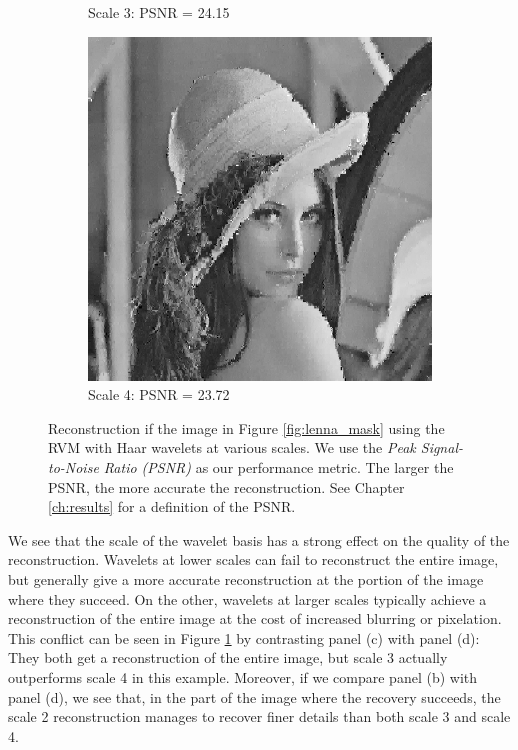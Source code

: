\begin{figure}
\begin{subfigure}{0.4\textwidth}
    \caption{Scale 3: PSNR = 24.15}
  \end{subfigure}
  \begin{subfigure}{0.4\textwidth}
    \includegraphics[width=\textwidth]{Chapter5/Images/lenna_haar4.png}
    \caption{Scale 4: PSNR = 23.72}
  \end{subfigure}  
  \caption{Reconstruction if the image in Figure \ref{fig:lenna_mask} using the RVM with Haar wavelets at various scales.
    We use the \emph{Peak Signal-to-Noise Ratio (PSNR)} as our performance metric. The larger the PSNR, the more accurate the reconstruction. See Chapter \ref{ch:results} for a definition of the PSNR.}
  \label{fig:lenna_rvm}
\end{figure}

We see that the scale of the wavelet basis has a strong effect on the quality of the reconstruction.
Wavelets at lower scales can fail to reconstruct the entire image, but generally give a more accurate reconstruction at the portion of the image where they succeed.
On the other, wavelets at larger scales typically achieve a reconstruction of the entire image at the cost of increased blurring or pixelation.
This conflict can be seen in Figure \ref{fig:lenna_rvm} by contrasting panel (c) with panel (d): They both get a reconstruction of the entire image, but scale 3 actually outperforms scale 4 in this example.
Moreover, if we compare panel (b) with panel (d), we see that, in the part of the image where the recovery succeeds, the scale 2 reconstruction manages to recover finer details than both scale 3 and scale 4.

